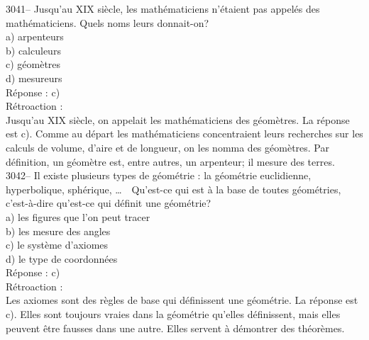 \documentclass[letterpaper, 12pt]{article}
\begin{document}
3041-- Jusqu'au {\scriptsize XIX\ieme{}} si\`ecle, les math\'ematiciens n'\'etaient pas appel\'es des math\'ematiciens. Quels noms leurs donnait-on?\\

a) arpenteurs\\
b) calculeurs\\
c) g\'eom\`etres\\
d) mesureurs\\

R\'eponse : c)\\

R\'etroaction :\\
Jusqu'au {\scriptsize XIX\ieme{}} si\`ecle, on appelait les math\'ematiciens des g\'eom\`etres. La r\'eponse est c). Comme au d\'epart les math\'ematiciens concentraient leurs recherches sur les calculs de volume, d'aire et de longueur, on les nomma des g\'eom\`etres. Par d\'efinition, un g\'eom\`etre est, entre autres, un arpenteur; il mesure des terres.\\



3042-- Il existe plusieurs types de g\'eom\'etrie : la g\'eom\'etrie euclidienne, hyperbolique, sph\'erique, \dots \ \ Qu'est-ce qui est \`a la base de toutes g\'eom\'etries, c'est-\`a-dire qu'est-ce qui d\'efinit une g\'eom\'etrie?\\

a) les figures que l'on peut tracer\\
b) les mesure des angles\\
c) le syst\`eme d'axiomes\\
d) le type de coordonn\'ees\\

R\'eponse : c)\\

R\'etroaction :\\
Les axiomes sont des r\`egles de base qui d\'efinissent une g\'eom\'etrie. La r\'eponse est c). Elles sont toujours vraies dans la g\'eom\'etrie qu'elles d\'efinissent, mais elles peuvent \^etre fausses dans une autre. Elles servent \`a d\'emontrer des th\'eor\`emes.\\
\end{document}
